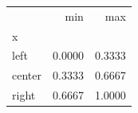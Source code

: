 \begin{tabular}{lrr}
\toprule
 & min & max \\
x &  &  \\
\midrule
left & 0.0000 & 0.3333 \\
center & 0.3333 & 0.6667 \\
right & 0.6667 & 1.0000 \\
\bottomrule
\end{tabular}
